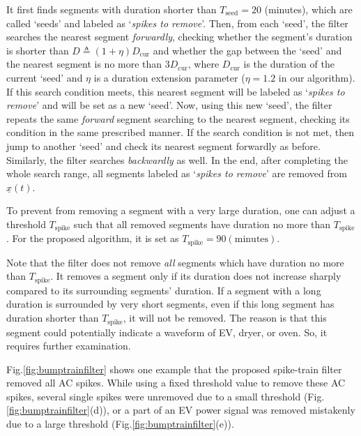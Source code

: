 \documentclass[conference]{IEEEtran}
\begin{document}
It first finds segments with duration shorter than $T_{\mathrm{seed}}=20$ (minutes), which are called `seeds' and labeled as `\emph{spikes to remove}'. Then, from each `seed', the filter searches the nearest segment \emph{forwardly}, checking whether the segment's duration is shorter than $D\triangleq(1+\eta) D_{\mathrm{cur}}$ and whether the gap between the `seed' and the nearest segment is no more than $3D_{\mathrm{cur}}$, where $D_{\mathrm{cur}}$ is the duration of the current `seed' and $\eta$ is a duration extension parameter ($\eta=1.2$ in our algorithm).  If this search condition meets, this nearest segment will be labeled as `\emph{spikes to remove}' and will be set as a new `seed'. Now, using this new `seed', the filter repeats the same \emph{forward} segment searching to the nearest segment, checking its condition in the same prescribed manner. If the search condition is not met, then jump to another `seed' and check its nearest segment forwardly as before. Similarly, the filter searches \emph{backwardly} as well. In the end, after completing the whole search range, all segments labeled as `\emph{spikes to remove}' are removed from $\underline{x}(t)$.

To prevent from removing a segment with a very large duration, one can adjust a threshold $T_{\mathrm{spike}}$ such that all removed segments have duration no more than $T_{\mathrm{spike}}$. For the proposed algorithm, it is set as $T_{\mathrm{spike}}=90 (\mathrm{minutes})$.


Note that the filter does not remove \emph{all} segments which have duration no more than $T_{\mathrm{spike}}$. It removes a segment only if its duration does not increase sharply compared to its surrounding segments' duration. If a segment with a long duration is surrounded by very short segments, even if this long segment has duration shorter than $T_{\mathrm{spike}}$, it will not be removed. The reason is that this segment could potentially indicate a waveform of EV, dryer, or oven.  So, it requires  further examination.

Fig.\ref{fig:bumptrainfilter} shows one example that the proposed spike-train filter removed all AC spikes. While using a fixed threshold value to remove these AC spikes, several single spikes were unremoved due to a small threshold (Fig.\ref{fig:bumptrainfilter}(d)), or a part of an EV power signal was removed mistakenly due to a large threshold (Fig.\ref{fig:bumptrainfilter}(e)).
\end{document}
